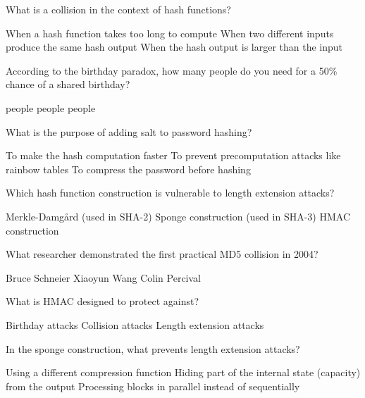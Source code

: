 \documentclass[10pt,a4paper,american]{exam}
\begin{document}
\begin{questions}
	\question What is a collision in the context of hash functions?
	\begin{randomizechoices}
		\choice When a hash function takes too long to compute
		\CorrectChoice When two different inputs produce the same hash output
		\choice When the hash output is larger than the input
	\end{randomizechoices}

	\question According to the birthday paradox, how many people do you need for a 50\% chance of a shared birthday?
	\begin{randomizechoices}
		 people
		 people
		 people
	\end{randomizechoices}

	\question What is the purpose of adding salt to password hashing?
	\begin{randomizechoices}
		\choice To make the hash computation faster
		\CorrectChoice To prevent precomputation attacks like rainbow tables
		\choice To compress the password before hashing
	\end{randomizechoices}

	\question Which hash function construction is vulnerable to length extension attacks?
	\begin{randomizechoices}
		\CorrectChoice Merkle-Damg\aa rd (used in SHA-2)
		\choice Sponge construction (used in SHA-3)
		\choice HMAC construction
	\end{randomizechoices}

	\question What researcher demonstrated the first practical MD5 collision in 2004?
	\begin{randomizechoices}
		\choice Bruce Schneier
		\CorrectChoice Xiaoyun Wang
		\choice Colin Percival
	\end{randomizechoices}

	\question What is HMAC designed to protect against?
	\begin{randomizechoices}
		\choice Birthday attacks
		\choice Collision attacks
		\CorrectChoice Length extension attacks
	\end{randomizechoices}

	\question In the sponge construction, what prevents length extension attacks?
	\begin{randomizechoices}
		\choice Using a different compression function
		\CorrectChoice Hiding part of the internal state (capacity) from the output
		\choice Processing blocks in parallel instead of sequentially
	\end{randomizechoices}


\end{questions}
\end{document}
